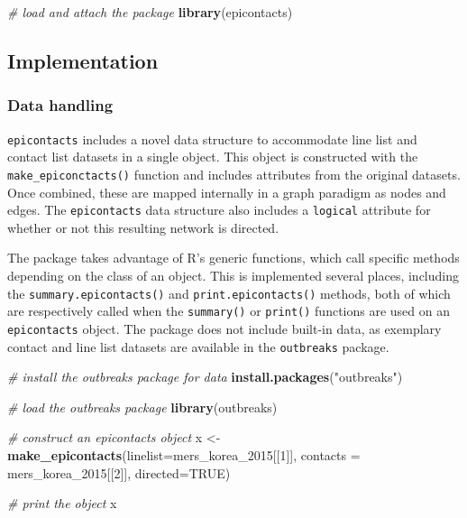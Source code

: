 \documentclass[9pt,a4paper,]{extarticle}
\newenvironment{Shaded}{\begin{snugshade}}{\end{snugshade}}
\newcommand{\KeywordTok}[1]{\textcolor[rgb]{0.13,0.29,0.53}{\textbf{#1}}}
\newcommand{\DataTypeTok}[1]{\textcolor[rgb]{0.13,0.29,0.53}{#1}}
\newcommand{\DecValTok}[1]{\textcolor[rgb]{0.00,0.00,0.81}{#1}}
\newcommand{\StringTok}[1]{\textcolor[rgb]{0.31,0.60,0.02}{#1}}
\newcommand{\CommentTok}[1]{\textcolor[rgb]{0.56,0.35,0.01}{\textit{#1}}}
\newcommand{\OtherTok}[1]{\textcolor[rgb]{0.56,0.35,0.01}{#1}}
\newcommand{\NormalTok}[1]{#1}
\theoremstyle{definition}
\theoremstyle{definition}
\theoremstyle{definition}
\theoremstyle{remark}
\begin{document}
\begin{Shaded}
\begin{Highlighting}[]
\CommentTok{# load and attach the package}
\KeywordTok{library}\NormalTok{(epicontacts)}
\end{Highlighting}
\end{Shaded}

\subsection{Implementation}\label{implementation}

\subsubsection{Data handling}\label{data-handling}

\texttt{epicontacts} includes a novel data structure to accommodate line list and contact list datasets in a single object. This object is constructed with the \texttt{make\_epiconctacts()} function and includes attributes from the original datasets. Once combined, these are mapped internally in a graph paradigm as nodes and edges. The \texttt{epicontacts} data structure also includes a \texttt{logical} attribute for whether or not this resulting network is directed.

The package takes advantage of R's generic functions, which call specific methods depending on the class of an object. This is implemented several places, including the \texttt{summary.epicontacts()} and \texttt{print.epicontacts()} methods, both of which are respectively called when the \texttt{summary()} or \texttt{print()} functions are used on an \texttt{epicontacts} object. The package does not include built-in data, as exemplary contact and line list datasets are available in the \texttt{outbreaks} package\citep{outbreaks}.

\begin{Shaded}
\begin{Highlighting}[]
\CommentTok{# install the outbreaks package for data}
\KeywordTok{install.packages}\NormalTok{(}\StringTok{"outbreaks"}\NormalTok{)}
\end{Highlighting}
\end{Shaded}

\begin{Shaded}
\begin{Highlighting}[]
\CommentTok{# load the outbreaks package}
\KeywordTok{library}\NormalTok{(outbreaks)}

\CommentTok{# construct an epicontacts object}
\NormalTok{x <-}\StringTok{ }\KeywordTok{make_epicontacts}\NormalTok{(}\DataTypeTok{linelist=}\NormalTok{mers_korea_}\DecValTok{2015}\NormalTok{[[}\DecValTok{1}\NormalTok{]],}
                      \DataTypeTok{contacts =}\NormalTok{ mers_korea_}\DecValTok{2015}\NormalTok{[[}\DecValTok{2}\NormalTok{]],}
                      \DataTypeTok{directed=}\OtherTok{TRUE}\NormalTok{)}

\CommentTok{# print the object   }
\NormalTok{x               }
\end{Highlighting}
\end{Shaded}
\end{document}

